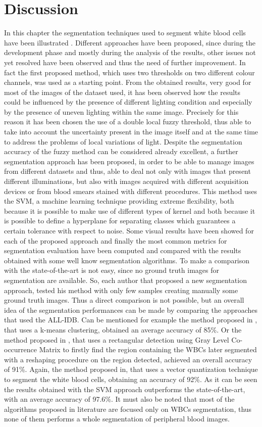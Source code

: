 \documentclass[final,a4paper,12pt,english]{UnicaPhdThesis3}
\begin{document}
	\section{Discussion}\label{sec:Discussion}
	In this chapter the segmentation techniques used to segment white blood cells have been illustrated . Different approaches have been proposed, since during the development phase and mostly during the analysis of the results, other issues not yet resolved have been observed and thus the need of further improvement. In fact the first proposed method, which uses two thresholds on two different colour channels, was used as a starting point. From the obtained results, very good for most of the images of the dataset used, it has been observed how the results could be influenced by the presence of different lighting condition and especially by the presence of uneven lighting within the same image. Precisely for this reason it has been chosen the use of a double local fuzzy threshold, thus able to take into account the uncertainty present in the image itself and at the same time to address the problems of local variations of light. Despite the segmentation accuracy of the fuzzy method can be considered already excellent, a further segmentation approach has been proposed, in order to be able to manage images from different datasets and thus, able to deal not only with images that present different illuminations, but also with images acquired with different acquisition devices or from blood smears stained with different procedures. This method uses the SVM, a machine learning technique providing extreme flexibility, both because it is possible to make use of different types of kernel and both because it is possible to define a hyperplane for separating classes which guarantees a certain tolerance with respect to noise. Some visual results have been showed for each of the proposed approach and finally the most common metrics for segmentation evaluation have been computed and compared with the results obtained with some well know segmentation algorithms. To make a comparison with the state-of-the-art is not easy, since no ground truth images for segmentation are available. So, each author that proposed a new segmentation approach, tested his method with only few samples creating manually some ground truth images. Thus a direct comparison is not possible, but an overall idea of the segmentation performances can be made by comparing the approaches that used the ALL-IDB. Can be mentioned for example the method proposed in \cite{Rawat}, that uses a k-means clustering, obtained an average accuracy of 85\%. Or the method proposed in \cite{Alilou}, that uses a rectangular detection using Gray Level Co-occurrence Matrix to firstly find the region containing the WBCs later segmented with a reshaping procedure on the region detected, achieved an overall accuracy of 91\%. Again, the method proposed in\cite{Kekre}, that uses a vector quantization technique to segment the white blood cells, obtaining an accuracy of 92\%. As it can be seen the results obtained with the SVM approach outperforms the state-of-the-art, with an average accuracy of 97.6\%. It must also be noted that most of the algorithms proposed in literature are focused only on WBCs segmentation, thus none of them performs a whole segmentation of peripheral blood images.
\end{document}
